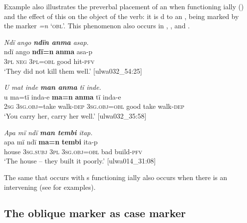 Example  also illustrates the preverbal placement of an  when functioning ially () and the effect of this on the  object of the verb: it is d to an , being marked by the  marker \textit{=n} ‘\textsc{obl}’. This phenomenon also occurs in , , and .

\ea%
    \label{ex:clause:76}
          \textit{Ndï ango \textbf{ndïn anma} asap.}\\
\gll    ndï  ango  \textbf{ndï=n}    \textbf{anma}  asa-p\\
    3\textsc{pl}  \textsc{neg}  \textsc{3pl=obl}  good  hit-\textsc{pfv}\\
\glt `They did not kill them well.’ [ulwa032\_54:25]
\z

\ea%
    \label{ex:clause:77}
          \textit{U mat inde \textbf{man anma} tï inde.}\\
\gll    u    ma=tï      inda-e    \textbf{ma=n}      \textbf{anma}  tï     inda-e\\
    2\textsc{sg}  3\textsc{sg.obj}=take  walk-\textsc{dep}  \textsc{3sg.obj=obl}  good  take    walk-\textsc{dep}\\
\glt `You carry her, carry her well.’ [ulwa032\_35:58]
\z

\ea%
    \label{ex:clause:78}
          \textit{Apa mï ndï \textbf{man tembi} itap.}\\
\gll    apa    mï      ndï  \textbf{ma=n}      \textbf{tembi}  ita-p\\
    house  \textsc{3sg.subj}  \textsc{3pl}  3\textsc{sg.obj=obl}  bad    build-\textsc{pfv}\\
\glt `The house -- they built it poorly.’ [ulwa014\_31:08]
\z

The same  that occurs with s functioning ially also occurs when there is an intervening  (see  for examples).


\subsection{The oblique marker as case marker}\label{sec:11.4.2}


